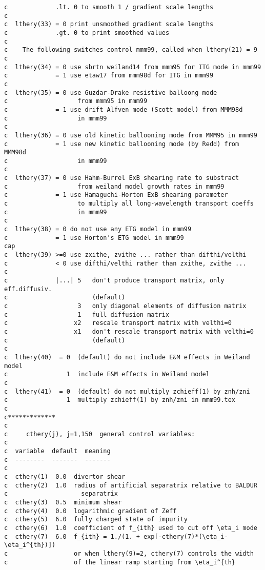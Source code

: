\begin{verbatim}
c             .lt. 0 to smooth 1 / gradient scale lengths
c
c  lthery(33) = 0 print unsmoothed gradient scale lengths
c             .gt. 0 to print smoothed values
c
c    The following switches control mmm99, called when lthery(21) = 9
c
c  lthery(34) = 0 use sbrtn weiland14 from mmm95 for ITG mode in mmm99 
c             = 1 use etaw17 from mmm98d for ITG in mmm99 
c
c  lthery(35) = 0 use Guzdar-Drake resistive balloong mode
c                   from mmm95 in mmm99
c             = 1 use drift Alfven mode (Scott model) from MMM98d
c                   in mmm99
c
c  lthery(36) = 0 use old kinetic ballooning mode from MMM95 in mmm99
c             = 1 use new kinetic ballooning mode (by Redd) from MMM98d
c                   in mmm99
c
c  lthery(37) = 0 use Hahm-Burrel ExB shearing rate to substract
c                   from weiland model growth rates in mmm99
c             = 1 use Hamaguchi-Horton ExB shearing parameter
c                   to multiply all long-wavelength transport coeffs
c                   in mmm99
c
c  lthery(38) = 0 do not use any ETG model in mmm99
c             = 1 use Horton's ETG model in mmm99
cap
c  lthery(39) >=0 use zxithe, zvithe ... rather than difthi/velthi
c             < 0 use difthi/velthi rather than zxithe, zvithe ... 
c
c             |...| 5   don't produce transport matrix, only eff.diffusiv. 
c                       (default)
c                   3   only diagonal elements of diffusion matrix 
c                   1   full diffusion matrix
c                  x2   rescale transport matrix with velthi=0 
c                  x1   don't rescale transport matrix with velthi=0 
c                       (default)
c
c  lthery(40)  = 0  (default) do not include E&M effects in Weiland model
c                1  include E&M effects in Weiland model
c
c  lthery(41)  = 0  (default) do not multiply zchieff(1) by znh/zni
c                1  multiply zchieff(1) by znh/zni in mmm99.tex
c
c*************
c
c     cthery(j), j=1,150  general control variables:
c
c  variable  default  meaning
c  --------  -------  -------
c
c  cthery(1)  0.0  divertor shear
c  cthery(2)  1.0  radius of artificial separatrix relative to BALDUR
c                    separatrix
c  cthery(3)  0.5  minimum shear
c  cthery(4)  0.0  logarithmic gradient of Zeff
c  cthery(5)  6.0  fully charged state of impurity
c  cthery(6)  1.0  coefficient of f_{ith} used to cut off \eta_i mode
c  cthery(7)  6.0  f_{ith} = 1./(1. + exp[-cthery(7)*(\eta_i-\eta_i^{th})])
c                  or when lthery(9)=2, cthery(7) controls the width
c                  of the linear ramp starting from \eta_i^{th}

\end{verbatim}
